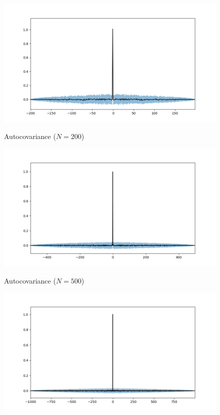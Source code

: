 \documentclass[11pt]{article}
\begin{document}
\begin{exercise}
\begin{figure}
    \centering
    \begin{minipage}[t]{0.3\textwidth}
    \centerline{\includegraphics[width=\textwidth]{imgs/autocov200.png}}
    \centerline{Autocovariance ($N=200$)}
    \end{minipage}
    \begin{minipage}[t]{0.3\textwidth}
    \centerline{\includegraphics[width=\textwidth]{imgs/autocov500.png}}
    \centerline{Autocovariance ($N=500$)}
    \end{minipage}
    \begin{minipage}[t]{0.3\textwidth}
    \centerline{\includegraphics[width=\textwidth]{imgs/autocov1000.png}}

\end{minipage}
\end{figure}
\end{exercise}
\end{document}
